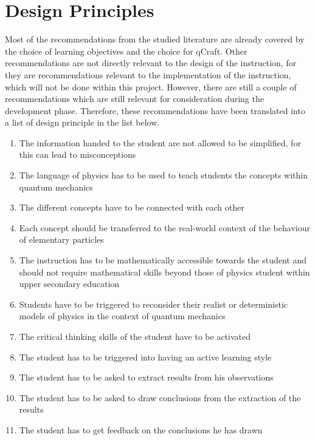 \documentclass[11pt,twoside]{report} %
\begin{document}
\chapter{Design Principles}
\label{ch:designprinciples}

Most of the recommendations from the studied literature are already covered by the choice of learning objectives and the choice for qCraft. Other recommendations are not directly relevant to the design of the instruction, for they are recommendations relevant to the implementation of the instruction, which will not be done within this project. However, there are still a couple of recommendations which are still relevant for consideration during the development phase. Therefore, these recommendations have been translated into a list of design principle in the list below.

\begin{enumerate}
\item \label{itm:simple}The information handed to the student are not allowed to be simplified, for this can lead to misconceptions
\item \label{itm:language} The language of physics has to be used to teach students the concepts within quantum mechanics
\item \label{itm:links}The different concepts have to be connected with each other
\item \label{itm:realworld}Each concept should be transferred to the real-world context of the behaviour of elementary particles
\item \label{itm:maths}The instruction has to be mathematically accessible towards the student and should not require mathematical skills beyond those of physics student within upper secondary education
\item \label{itm:models}Students have to be triggered to reconsider their realist or deterministic models of physics in the context of quantum mechanics
\item \label{itm:critic}The critical thinking skills of the student have to be activated
\item \label{itm:active}The student has to be triggered into having an active learning style
\item \label{itm:results}The student has to be asked to extract results from his observations
\item \label{itm:conclusions}The student has to be asked to draw conclusions from the extraction of the results
\item \label{itm:feedback}The student has to get feedback on the conclusions he has drawn
\end{enumerate}
\end{document}

